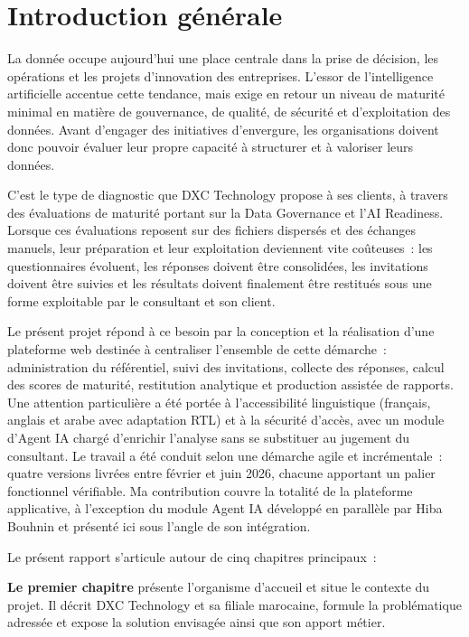 \documentclass[12pt,a4paper]{report}
\begin{document}
\cleardoublepage
{}

\chapter*{Introduction générale}
La donnée occupe aujourd'hui une place centrale dans la prise de décision, les opérations et les projets d'innovation des entreprises. L'essor de l'intelligence artificielle accentue cette tendance, mais exige en retour un niveau de maturité minimal en matière de gouvernance, de qualité, de sécurité et d'exploitation des données. Avant d'engager des initiatives d'envergure, les organisations doivent donc pouvoir évaluer leur propre capacité à structurer et à valoriser leurs données.

C'est le type de diagnostic que DXC Technology propose à ses clients, à travers des évaluations de maturité portant sur la Data Governance et l'AI Readiness. Lorsque ces évaluations reposent sur des fichiers dispersés et des échanges manuels, leur préparation et leur exploitation deviennent vite coûteuses~: les questionnaires évoluent, les réponses doivent être consolidées, les invitations doivent être suivies et les résultats doivent finalement être restitués sous une forme exploitable par le consultant et son client.

Le présent projet répond à ce besoin par la conception et la réalisation d'une plateforme web destinée à centraliser l'ensemble de cette démarche~: administration du référentiel, suivi des invitations, collecte des réponses, calcul des scores de maturité, restitution analytique et production assistée de rapports. Une attention particulière a été portée à l'accessibilité linguistique (français, anglais et arabe avec adaptation RTL) et à la sécurité d'accès, avec un module d'Agent IA chargé d'enrichir l'analyse sans se substituer au jugement du consultant. Le travail a été conduit selon une démarche agile et incrémentale~: quatre versions livrées entre février et juin 2026, chacune apportant un palier fonctionnel vérifiable. Ma contribution couvre la totalité de la plateforme applicative, à l'exception du module Agent IA développé en parallèle par Hiba Bouhnin et présenté ici sous l'angle de son intégration.

Le présent rapport s'articule autour de cinq chapitres principaux~:

{\color{dxcblue}\textbf{Le premier chapitre}} présente l'organisme d'accueil et situe le contexte du projet. Il décrit DXC Technology et sa filiale marocaine, formule la problématique adressée et expose la solution envisagée ainsi que son apport métier.
\end{document}
